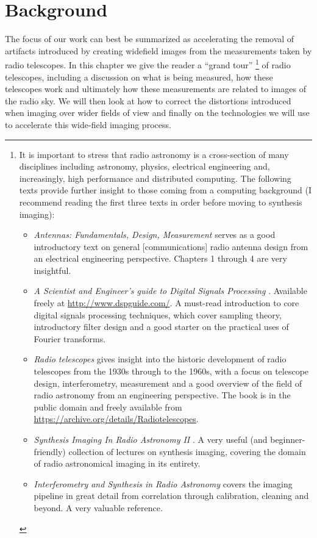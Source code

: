 \chapter{Background}
The focus of our work can best be summarized as accelerating the removal of artifacts introduced by creating widefield images from the measurements taken by radio telescopes. 
In this chapter we give the reader a ``grand tour'' \footnote{It is important to stress that radio astronomy is a cross-section of many disciplines including astronomy, physics, 
electrical engineering and, increasingly, high performance and distributed computing. The following texts provide further insight to those coming from a computing background (I recommend 
reading the first three texts in order before moving to synthesis imaging):
\begin{itemize}
 \item \textit{Antennas: Fundamentals, Design, Measurement} \cite{blake2009antennas} serves as a good introductory text on general [communications] radio antenna design from an electrical engineering perspective. Chapters 1 through 4
 are very insightful.
 \item \textit{A Scientist and Engineer's guide to Digital Signals Processing} \cite{smith1997scientist}. Available freely at \url{http://www.dspguide.com/}. A must-read introduction to core digital 
 signals processing techniques, which cover sampling theory, introductory filter design and a good starter on the practical uses of Fourier transforms.
 \item \textit{Radio telescopes} \cite{christiansenradiotelescopes} gives insight into the historic development of radio telescopes from the 1930s through to the 1960s, with a focus on telescope design, interferometry, measurement and a 
 good overview of the field of radio astronomy from an engineering perspective. The book is in the public domain and freely available from \url{https://archive.org/details/Radiotelescopes}.
 \item \textit{Synthesis Imaging In Radio Astronomy II} \cite{taylor1999synthesis}. A very useful (and beginner-friendly) collection of lectures on synthesis imaging, covering the domain of radio astronomical imaging 
 in its entirety.
 \item \textit{Interferometry and Synthesis in Radio Astronomy} \cite{thompson2008interferometry} covers the imaging pipeline in great detail from correlation through calibration, cleaning
 and beyond. A very valuable reference.
\end{itemize}
} of radio telescopes, including a discussion on what is being measured, how these telescopes work and ultimately how these 
measurements are related to images of the radio sky. We will then look at how to correct the distortions introduced when imaging over wider fields of view and finally on 
the technologies we will use to accelerate this wide-field imaging process.
